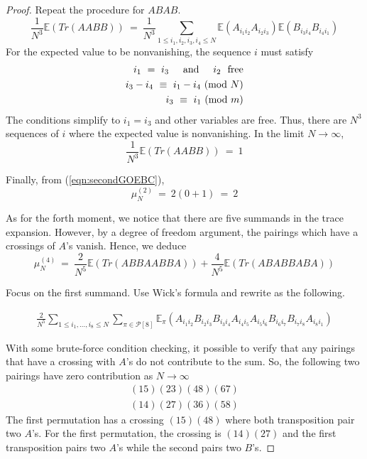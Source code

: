 \documentclass[12pt,reqno]{amsart}
\theoremstyle{plain} %
\theoremstyle{remark}
\theoremstyle{definition}
\renewcommand{\mod}[1]{\textup{ (mod~$#1$)}}
\begin{document}
\begin{proof}
Repeat the procedure for $ABAB$. 
\begin{equation}
    \frac 1 {N^{3}} \mathbb{E}(Tr(AABB)) \
    =  \
    \frac 1 {N^3} 
    \sum_{1 \leq i_1, i_2, i_3, i_4 \leq N}
    \mathbb{E} (
        A_{i_1i_2}A_{i_2i_3}
    )
\mathbb{E} (
        B_{i_3i_4}B_{i_4i_1}
    )
\end{equation}
For the expected value to be nonvanishing, the sequence $i$ must satisfy 
\begin{eqnarray}
    i_1 \ = \ i_3 \textAnd i_2 \ \  \textrm{free} \\
    i_3 - i_4 \ \equiv \ i_1 - i_4 \mod N \\
    i_3 \ \equiv \ i_1 \mod m
\end{eqnarray}
The conditions simplify to $i_1 = i_3$ and other variables are free. 
Thus, there are $N^3$ sequences of $i$ where the expected value is 
nonvanishing. In the limit $N\rightarrow \infty$, 
\begin{equation}
    \frac 1 {N^{3}} \mathbb{E}(Tr(AABB)) \
    =  \ 1
\end{equation}

Finally, from (\ref{eqn:secondGOEBC}), 
\[
    \mu_N^{(2)} \ = \ 2 (0 + 1) \ = \ 2
\]

As for the forth moment, we notice that there are five summands in the 
trace expansion. However, by a degree of freedom argument, the pairings 
which have a crossings of $A$'s vanish. Hence, we deduce 
\begin{equation}
    \label{eqn:forthGOEBC}
    \mu_N^{(4)} \ = \ \frac 2 {N^{5}} \mathbb{E}(Tr(ABBAABBA)) + \frac 4 {N^5}\mathbb{E}(Tr(ABABBABA))
\end{equation}

Focus on the first summand. Use Wick's formula and rewrite as the following. 

\begin{equation}
    \begin{split}
\frac{2}{N^5} \sum_{1 \leq i_1, \dots,  i_8 \leq N} 
\sum_{\pi \in \mathcal{P}[8]} \mathbb{E}_\pi \left( A_{i_1i_2} B_{i_2i_3} B_{i_3i_4} A_{i_4i_5} A_{i_5i_6} B_{i_6i_7} B_{i_7i_8} A_{i_8i_1} \right)
    \end{split}
\end{equation}



With some brute-force condition checking, it possible to verify that 
any pairings that have a crossing with $A$'s do not contribute to the sum. 
So, the following two pairings have zero contribution as $N\rightarrow \infty$
\begin{eqnarray}
    (15)(23)(48)(67) \\ 
    (14)(27)(36)(58)
\end{eqnarray}
The first permutation has a crossing $(15)(48)$ where both transposition 
pair two $A$'s. For the first permutation, the crossing is $(14)(27)$ and 
the first transposition pairs two $A$'s while the second pairs two $B$'s. 


\end{proof}
\end{document}
